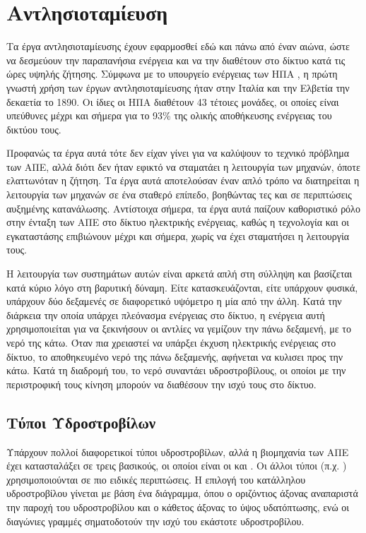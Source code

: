 \documentclass[12pt]{report}
\begin{document}
\section{Αντλησιοταμίευση}
Τα έργα αντλησιοταμίευσης έχουν εφαρμοσθεί εδώ και πάνω από έναν αιώνα, ώστε να δεσμεύουν την παραπανήσια ενέργεια και να την διαθέτουν στο δίκτυο κατά τις ώρες υψηλής ζήτησης. 
Σύμφωνα με το υπουργείο ενέργειας των ΗΠΑ \parencite{energygov1801}, η πρώτη γνωστή χρήση των έργων αντλησιοταμίευσης ήταν στην Ιταλία και την Ελβετία την δεκαετία το 1890. Οι ίδιες οι ΗΠΑ διαθέτουν 43 τέτοιες μονάδες, οι
οποίες είναι υπεύθυνες μέχρι και σήμερα για το 93\% της ολικής αποθήκευσης ενέργειας του δικτύου τους. 

Προφανώς τα έργα αυτά τότε δεν είχαν γίνει για να καλύψουν το τεχνικό πρόβλημα των ΑΠΕ, αλλά διότι δεν ήταν εφικτό να
σταματάει η λειτουργία των μηχανών, όποτε ελαττωνόταν η ζήτηση. Τα έργα αυτά αποτελούσαν έναν απλό τρόπο να διατηρείται η λειτουργία των μηχανών σε ένα σταθερό επίπεδο, βοηθώντας τες και σε περιπτώσεις αυξημένης κατανάλωσης.
Αντίστοιχα σήμερα, τα έργα αυτά παίζουν καθοριστικό ρόλο στην ένταξη των ΑΠΕ στο δίκτυο ηλεκτρικής ενέργειας, καθώς η τεχνολογία και οι εγκαταστάσης επιβιώνουν μέχρι και σήμερα, χωρίς να έχει σταματήσει η λειτουργία τους.

Η λειτουργία των συστημάτων αυτών είναι αρκετά απλή στη σύλληψη και βασίζεται κατά κύριο λόγο στη βαρυτική δύναμη. Είτε κατασκευάζονται, είτε υπάρχουν φυσικά, υπάρχουν δύο δεξαμενές σε διαφορετικό υψόμετρο η μία από την άλλη.
Κατά την διάρκεια την οποία υπάρχει πλεόνασμα ενέργειας στο δίκτυο, η ενέργεια αυτή χρησιμοποιείται για να ξεκινήσουν οι αντλίες να γεμίζουν την πάνω δεξαμενή, με το νερό της κάτω. Όταν πια χρειαστεί να υπάρξει έκχυση 
ηλεκτρικής ενέργειας στο δίκτυο, το αποθηκευμένο νερό της πάνω δεξαμενής, αφήνεται να κυλισει προς την κάτω. Κατά τη διαδρομή του, το νερό συναντάει υδροστροβίλους, οι οποίοι με την περιστροφική τους κίνηση μπορούν
να διαθέσουν την ισχύ τους στο δίκτυο. 

\subsection{Τύποι Υδροστροβίλων}
Υπάρχουν πολλοί διαφορετικοί τύποι υδροστροβίλων, αλλά η βιομηχανία των ΑΠΕ έχει κατασταλάξει σε τρεις βασικούς, οι οποίοι είναι οι {} και {}. Οι άλλοι τύποι 
(π.χ. {}) χρησιμοποιούνται σε πιο ειδικές περιπτώσεις. Η επιλογή του κατάλληλου υδροστροβίλου γίνεται με βάση ένα διάγραμμα, όπου ο οριζόντιος άξονας αναπαριστά την παροχή του υδροστροβίλου
και ο κάθετος άξονας το ύψος υδατόπτωσης, ενώ οι διαγώνιες γραμμές σηματοδοτούν την ισχύ του εκάστοτε υδροστροβίλου.
\end{document}
